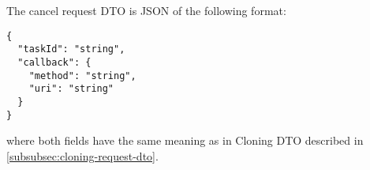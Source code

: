 \documentclass[../main.tex]{subfiles}
\begin{document}
The cancel request DTO is JSON of the following format:

\begin{lstlisting}[numbers=none]
{
  "taskId": "string",
  "callback": {
    "method": "string",
    "uri": "string"
  }
}
\end{lstlisting}

where both fields have the same meaning as in Cloning DTO described in \ref{subsubsec:cloning-request-dto}.
\end{document}
